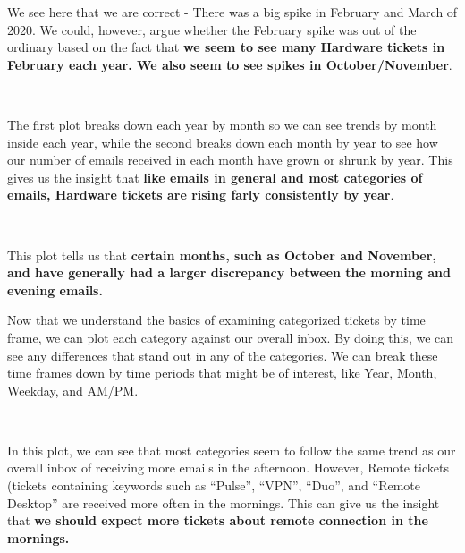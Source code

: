 \documentclass[11pt]{article}
\begin{document}
    We see here that we are correct - There was a big spike in February and
March of 2020. We could, however, argue whether the February spike was
out of the ordinary based on the fact that \textbf{we seem to see many
Hardware tickets in February each year. We also seem to see spikes in
October/November}.

    \begin{center}
    \end{center}
    { \hspace*{\fill} \\}
    
    The first plot breaks down each year by month so we can see trends by
month inside each year, while the second breaks down each month by year
to see how our number of emails received in each month have grown or
shrunk by year. This gives us the insight that \textbf{like emails in
general and most categories of emails, Hardware tickets are rising farly
consistently by year}.

    \begin{center}
    \end{center}
    { \hspace*{\fill} \\}
    
    This plot tells us that \textbf{certain months, such as October and
November, and have generally had a larger discrepancy between the
morning and evening emails.}

    Now that we understand the basics of examining categorized tickets by
time frame, we can plot each category against our overall inbox. By
doing this, we can see any differences that stand out in any of the
categories. We can break these time frames down by time periods that
might be of interest, like Year, Month, Weekday, and AM/PM.

    \begin{center}

    \end{center}
    { \hspace*{\fill} \\}
    
    In this plot, we can see that most categories seem to follow the same
trend as our overall inbox of receiving more emails in the afternoon.
However, Remote tickets (tickets containing keywords such as ``Pulse'',
``VPN'', ``Duo'', and ``Remote Desktop'' are received more often in the
mornings. This can give us the insight that \textbf{we should expect
more tickets about remote connection in the mornings.}
\end{document}
